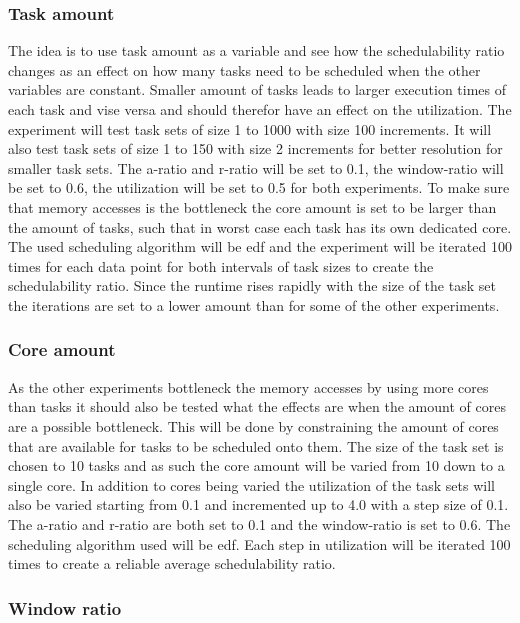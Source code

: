 \documentclass{kththesis}
\begin{document}
\subsubsection{Task amount}

The idea is to use task amount as a variable and see how the schedulability ratio changes as an
effect on how many tasks need to be scheduled when the other variables are constant. Smaller amount
of tasks leads to larger execution times of each task and vise versa and should therefor have an
effect on the utilization. The experiment will test task sets of size 1 to 1000 with size 100
increments. It will also test task sets of size 1 to 150 with size 2 increments for better
resolution for smaller task sets. The \acrshort{a}-ratio and \acrshort{r}-ratio will be set to 0.1,
the window-ratio will be set to 0.6, the utilization will be set to 0.5 for both experiments. To
make sure that memory accesses is the bottleneck the core amount is set to be larger than the amount
of tasks, such that in worst case each task has its own dedicated core. The used scheduling
algorithm will be \acrshort{edf} and the experiment will be iterated 100 times for each data point
for both intervals of task sizes to create the schedulability ratio. Since the runtime rises rapidly
with the size of the task set the iterations are set to a lower amount than for some of the other
experiments.


\subsubsection{Core amount}

As the other experiments bottleneck the memory accesses by using more cores than tasks it should
also be tested what the effects are when the amount of cores are a possible bottleneck. This will be
done by constraining the amount of cores that are available for tasks to be scheduled onto them. The
size of the task set is chosen to 10 tasks and as such the core amount will be varied from 10 down
to a single core. In addition to cores being varied the utilization of the task sets will also be
varied starting from 0.1 and incremented up to 4.0 with a step size of 0.1. The \acrshort{a}-ratio
and \acrshort{r}-ratio are both set to 0.1 and the window-ratio is set to 0.6. The scheduling
algorithm used will be \acrshort{edf}. Each step in utilization will be iterated 100 times to create
a reliable average schedulability ratio.


\subsubsection{Window ratio}
\end{document}
